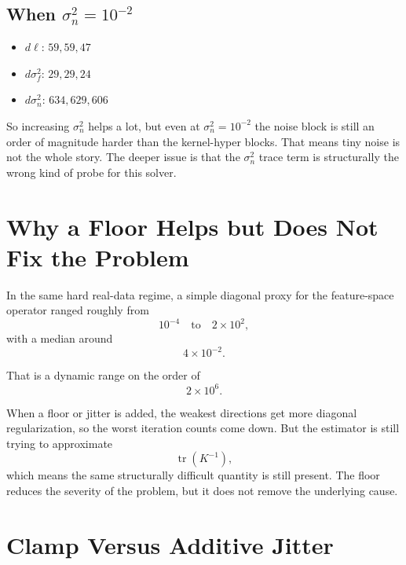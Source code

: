\documentclass[11pt]{article}
\begin{document}
\subsection*{When $\sigma_n^2 = 10^{-2}$}
\begin{itemize}
  \item $d\ell$: $59, 59, 47$
  \item $d\sigma_f^2$: $29, 29, 24$
  \item $d\sigma_n^2$: $634, 629, 606$
\end{itemize}

So increasing $\sigma_n^2$ helps a lot, but even at $\sigma_n^2 = 10^{-2}$ the
noise block is still an order of magnitude harder than the kernel-hyper blocks.
That means tiny noise is not the whole story. The deeper issue is that the
$\sigma_n^2$ trace term is structurally the wrong kind of probe for this solver.

\section*{Why a Floor Helps but Does Not Fix the Problem}

In the same hard real-data regime, a simple diagonal proxy for the feature-space
operator ranged roughly from
\begin{equation}
10^{-4}
\quad \text{to} \quad
2 \times 10^2,
\end{equation}
with a median around
\begin{equation}
4 \times 10^{-2}.
\end{equation}

That is a dynamic range on the order of
\begin{equation}
2 \times 10^6.
\end{equation}

When a floor or jitter is added, the weakest directions get more diagonal
regularization, so the worst iteration counts come down. But the estimator is
still trying to approximate
\begin{equation}
\operatorname{tr}(K^{-1}),
\end{equation}
which means the same structurally difficult quantity is still present. The
floor reduces the severity of the problem, but it does not remove the
underlying cause.

\section*{Clamp Versus Additive Jitter}
\end{document}
